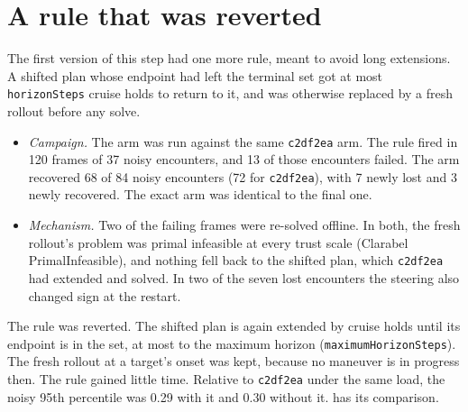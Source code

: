 \documentclass[11pt]{article}
\begin{document}
\section{A rule that was reverted}
\label{sec:reverted}
The first version of this step had one more rule, meant to avoid long
extensions. A shifted plan whose endpoint had left the terminal set got at
most \texttt{horizonSteps} cruise holds to return to it, and was otherwise
replaced by a fresh rollout before any solve.
\begin{itemize}
\item \emph{Campaign.} The arm was run against the same \texttt{c2df2ea}
  arm. The rule fired in 120 frames of 37 noisy encounters, and 13 of
  those encounters failed. The arm recovered 68 of 84 noisy encounters (72
  for \texttt{c2df2ea}), with 7 newly lost and 3 newly recovered. The exact
  arm was identical to the final one.
\item \emph{Mechanism.} Two of the failing frames were re-solved offline.
  In both, the fresh rollout's problem was primal infeasible at every trust
  scale (Clarabel PrimalInfeasible), and nothing fell back to the shifted
  plan, which \texttt{c2df2ea} had extended and solved. In two of the seven
  lost encounters the steering also changed sign at the restart.
\end{itemize}
The rule was reverted. The shifted plan is again extended by cruise holds
until its endpoint is in the set, at most to the maximum horizon
(\texttt{maximumHorizonSteps}). The fresh rollout at a target's onset
was kept, because no maneuver is in progress then. The rule gained little
time. Relative to \texttt{c2df2ea} under the same load, the noisy 95th
percentile was 0.29 with it and 0.30 without it.  has
its comparison.
\end{document}
